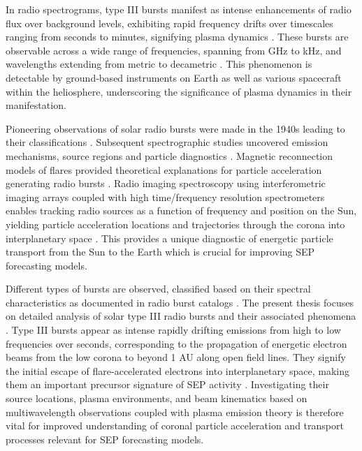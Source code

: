 In radio spectrograms, type III bursts manifest as intense enhancements of radio flux over background levels, exhibiting rapid frequency drifts over timescales ranging from seconds to minutes, signifying plasma dynamics \citep{reid_2017}. These bursts are observable across a wide range of frequencies, spanning from GHz to kHz, and wavelengths extending from metric to decametric \citep{wild50, lecacheux89, bonnin8}. This phenomenon is detectable by ground-based instruments on Earth as well as various spacecraft within the heliosphere, underscoring the significance of plasma dynamics in their manifestation.

Pioneering observations of solar radio bursts were made in the 1940s leading to their classifications \citep{wild_1963}. Subsequent spectrographic studies uncovered emission mechanisms, source regions and particle diagnostics \citep{suzuki_1985}. Magnetic reconnection models of flares provided theoretical explanations for particle acceleration generating radio bursts \citep{holman_2011}. Radio imaging spectroscopy using interferometric imaging arrays coupled with high time/frequency resolution spectrometers enables tracking radio sources as a function of frequency and position on the Sun, yielding particle acceleration locations and trajectories through the corona into interplanetary space \citep{krucker_2011, klassen_2003a, klassen_2003b}. This provides a unique diagnostic of energetic particle transport from the Sun to the Earth which is crucial for improving SEP forecasting models.

Different types of bursts are observed, classified based on their spectral characteristics as documented in radio burst catalogs \citep{wild_1963}. The present thesis focuses on detailed analysis of solar type III radio bursts and their associated phenomena \citep{reid14}. Type III bursts appear as intense rapidly drifting emissions from high to low frequencies over seconds, corresponding to the propagation of energetic electron beams from the low corona to beyond 1 AU along open field lines. They signify the initial escape of flare-accelerated electrons into interplanetary space, making them an important precursor signature of SEP activity \citep{cane_2002, macdowall_2003}. Investigating their source locations, plasma environments, and beam kinematics based on multiwavelength observations coupled with plasma emission theory is therefore vital for improved understanding of coronal particle acceleration and transport processes relevant for SEP forecasting models.

